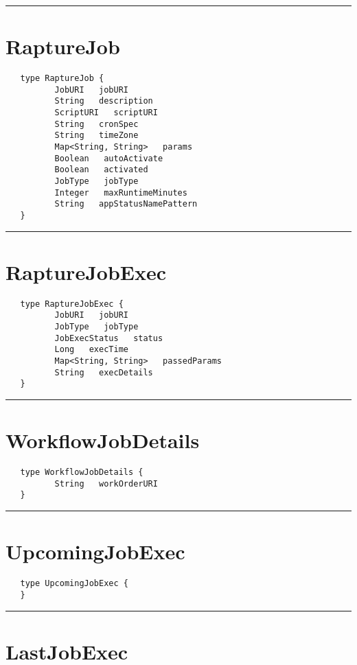\rule{15cm}{2pt}
\section{RaptureJob}
\label{type:RaptureJob}

\begin{verbatim}
   type RaptureJob {
          JobURI   jobURI
          String   description
          ScriptURI   scriptURI
          String   cronSpec
          String   timeZone
          Map<String, String>   params
          Boolean   autoActivate
          Boolean   activated
          JobType   jobType
          Integer   maxRuntimeMinutes
          String   appStatusNamePattern
   }
\end{verbatim}

\rule{15cm}{2pt}
\section{RaptureJobExec}
\label{type:RaptureJobExec}

\begin{verbatim}
   type RaptureJobExec {
          JobURI   jobURI
          JobType   jobType
          JobExecStatus   status
          Long   execTime
          Map<String, String>   passedParams
          String   execDetails
   }
\end{verbatim}

\rule{15cm}{2pt}
\section{WorkflowJobDetails}
\label{type:WorkflowJobDetails}

\begin{verbatim}
   type WorkflowJobDetails {
          String   workOrderURI
   }
\end{verbatim}

\rule{15cm}{2pt}
\section{UpcomingJobExec}
\label{type:UpcomingJobExec}

\begin{verbatim}
   type UpcomingJobExec {
   }
\end{verbatim}

\rule{15cm}{2pt}
\section{LastJobExec}
\label{type:LastJobExec}

